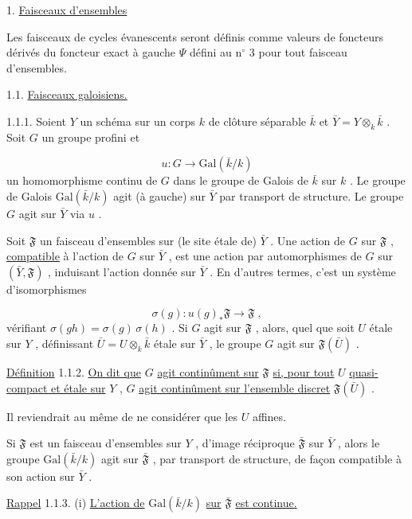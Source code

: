 1. \underline{Faisceaux d'ensembles}

Les faisceaux de cycles évanescents seront définis comme valeurs de foncteurs dérivés du foncteur exact à gauche $\Psi$ défini au n$^{\circ}$ 3 pour tout faisceau d'ensembles.


1.1. \underline{Faisceaux galoisiens.}

1.1.1. Soient $Y$ un schéma sur un corps $k$ de clôture séparable $\bar{k}$ et $\bar{Y} = Y \otimes_{k} \bar{k}$ . Soit $G$ un groupe profini et

\begin{equation*}
u : G \longrightarrow \mathrm{Gal}(\bar{k}/k)
\end{equation*}
un homomorphisme continu de $G$ dans le groupe de Galois de $\bar{k}$ sur $k$ . Le groupe de Galois $\mathrm{Gal}(\bar{k}/k)$ agit (à gauche) sur $\bar{Y}$ par transport de structure. Le groupe $G$ agit sur $\bar{Y}$ via $u$ .

Soit $\mathfrak{F}$ un faisceau d'ensembles sur (le site étale de) $\bar{Y}$ . Une action de $G$ sur $\mathfrak{F}$ , \underline{compatible} à l'action de $G$ sur $\bar{Y}$ , est une action par automorphismes de $G$ sur $(\bar{Y}, \mathfrak{F} )$ , induisant l'action donnée sur $\bar{Y}$ . En d'autres termes, c'est un système d'isomorphismes

\begin{equation*}
\sigma(g) : u(g)_{*} \mathfrak{F} \longrightarrow \mathfrak{F} \;,
\end{equation*}
vérifiant $\sigma(gh) = \sigma(g)\, \sigma(h)$ . Si $G$ agit sur $\mathfrak{F}$ , alors, quel que soit $U$ étale sur $Y$ , définissant $\bar{U} = U \otimes_{k} \bar{k}$ étale sur $\bar{Y}$ , le groupe $G$ agit sur $\mathfrak{F}(\bar{U})$ .

\underline{Définition} 1.1.2. \underline{On dit que} $G$ \underline{agit continûment sur} $\mathfrak{F}$ \underline{si, pour tout} $U$ \underline{quasi-compact et étale sur} $Y$ , $G$ \underline{agit continûment sur l'ensemble discret} $\mathfrak{F}(\bar{U})$ .

Il reviendrait au même de ne considérer que les $U$ affines.

Si $\mathfrak{F}$ est un faisceau d'ensembles sur $Y$ , d'image réciproque $\bar{\mathfrak{F}}$ sur $\bar{Y}$ , alors le groupe $\mathrm{Gal}(\bar{k}/k)$ agit sur $\bar{\mathfrak{F}}$ , par transport de structure, de façon compatible à son action sur $\bar{Y}$ .

\underline{Rappel} 1.1.3. (i) \underline{L'action de} $\mathrm{Gal}(\bar{k}/k)$ \underline{sur} $\bar{\mathfrak{F}}$ \underline{est continue.}


